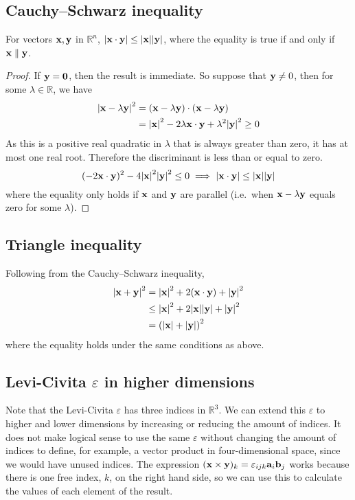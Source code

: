 \subsection{Cauchy--Schwarz inequality}
\begin{proposition}
	For vectors \(\vb x, \vb y\) in \(\mathbb R^n\), \(\abs{\vb x \cdot \vb y} \leq \abs{\vb x} \abs{\vb y}\), where the equality is true if and only if \(\vb x \parallel \vb y\).
\end{proposition}
\begin{proof}
	If \(\vb y = \vb 0\), then the result is immediate.
	So suppose that \(\vb y \neq 0\), then for some \(\lambda \in \mathbb R\), we have
	\begin{align*}
		\abs{\vb x - \lambda \vb y}^2 & =
		(\vb x - \lambda \vb y) \cdot (\vb x - \lambda \vb y)                                                          \\
		                              & = \abs{\vb x}^2 - 2 \lambda \vb x \cdot \vb y + \lambda^2 \abs{\vb y}^2 \geq 0
	\end{align*}
	As this is a positive real quadratic in \(\lambda\) that is always greater than zero, it has at most one real root.
	Therefore the discriminant is less than or equal to zero.
	\[
		(-2 \vb x \cdot \vb y)^2 - 4 \abs{\vb x}^2\abs{\vb y}^2 \leq 0
		\implies \abs{\vb x \cdot \vb y} \leq \abs{\vb x}\abs{\vb y}
	\]
	where the equality only holds if \(\vb x\) and \(\vb y\) are parallel (i.e.\ when \(\vb x - \lambda \vb y\) equals zero for some \(\lambda\)).
\end{proof}

\subsection{Triangle inequality}
Following from the Cauchy--Schwarz inequality,
\begin{align*}
	\abs{\vb x + \vb y}^2
	 & = \abs{\vb x}^2 + 2(\vb x \cdot \vb y) + \abs{\vb y}^2        \\
	 & \leq \abs{\vb x}^2 + 2 \abs{\vb x}\abs{\vb y} + \abs{\vb y}^2 \\
	 & = \left(\abs{\vb x} + \abs{\vb y}\right)^2
\end{align*}
where the equality holds under the same conditions as above.

\subsection{Levi-Civita \texorpdfstring{\( \varepsilon \)}{𝜀} in higher dimensions}
Note that the Levi-Civita \(\varepsilon\) has three indices in \(\mathbb R^3\).
We can extend this \(\varepsilon\) to higher and lower dimensions by increasing or reducing the amount of indices.
It does not make logical sense to use the same \(\varepsilon\) without changing the amount of indices to define, for example, a vector product in four-dimensional space, since we would have unused indices.
The expression \((\vb x \times \vb y)_k = \varepsilon_{ijk} \vb a_i \vb b_j\) works because there is one free index, \(k\), on the right hand side, so we can use this to calculate the values of each element of the result.

